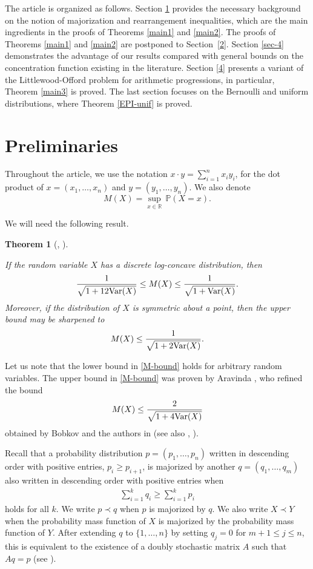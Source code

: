 \documentclass[11pt]{article}
\newtheorem{thm}{Theorem}[section]
\newcommand{\R}{\mathbb{R}}
\DeclareMathOperator{\Var}{Var}
\newcommand{\1}{[1]}
\newcommand{\Prob}{\mathbb{P}}
\def\Var{{\rm Var}}
\begin{document}
The article is organized as follows. Section \ref{prel} provides the necessary background on the notion of majorization and rearrangement inequalities, which are the main ingredients in the proofs of Theorems \ref{main1} and \ref{main2}. The proofs of Theorems \ref{main1} and \ref{main2} are postponed to Section~\ref{2}. Section \ref{sec-4} demonstrates the advantage of our results compared with general bounds on the concentration function existing in the literature. Section \ref{4} presents a variant of the Littlewood-Offord problem for arithmetic progressions, in particular, Theorem \ref{main3} is proved. The last section focuses on the Bernoulli and uniform distributions, where Theorem \ref{EPI-unif} is proved.




\section{Preliminaries}\label{prel}

Throughout the article, we use the notation $x \cdot y = \sum_{i=1}^n x_i y_i$, for the dot product of $x=(x_1, \dots, x_n)$ and $y=(y_1, \dots, y_n)$. We also denote
\begin{equation}\label{M}
M(X) = \sup_{x \in \R} \, \Prob(X = x).
\end{equation}


We will need the following result.


\begin{thm}[\cite{A}, \cite{BMM}]\label{LC}

If the random variable $X$ has a discrete log-concave distribution, then
\begin{equation}\label{M-bound}
\frac{1}{\sqrt{1 + 12\Var(X)}} \leq M(X) \leq \frac{1}{\sqrt{1 + \Var(X)}}.
\end{equation}
Moreover, if the distribution of $X$ is symmetric about a point, then the upper bound may be sharpened to
$$ M(X) \leq \frac{1}{\sqrt{1 + 2\Var(X)}}. $$

\end{thm}

Let us note that the lower bound in \eqref{M-bound} holds for arbitrary random variables. The upper bound in \eqref{M-bound} was proven by Aravinda \cite{A}, who refined the bound
$$ M(X) \leq \frac{2}{\sqrt{1 + 4\Var(X)}} $$
obtained by Bobkov and the authors in \cite{BMM} (see also \cite{GMPP}, \cite{JMNS}).



Recall that a probability distribution $p = (p_1, \dots, p_n)$ written in descending order with positive entries, $p_i \geq p_{i+1}$, is majorized by another $q = (q_1, \dots, q_m)$ also written in descending order with positive entries when 
\begin{align}
    \sum_{i=1}^k q_i \geq \sum_{i=1}^k p_i
\end{align}
holds for all $k$. We write $p \prec q$ when $p$ is majorized by $q$. We also write $X \prec Y$ when the probability mass function of $X$ is majorized by the probability mass function of $Y$. After extending $q$ to $\{1, \dots, n\}$ by setting $q_j = 0$ for $m+1 \leq j \leq n$, this is equivalent to the existence of a doubly stochastic matrix $A$ such that $Aq = p$ (see \cite{MOA}). 
\end{document}
